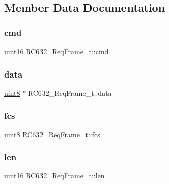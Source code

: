 \subsection{Member Data Documentation}
\mbox{\label{struct_r_c632___req_frame__t_a68d25a2924669c1db2505dfbd6fcb78c}} 
\subsubsection{\texorpdfstring{cmd}{cmd}}
{\footnotesize\ttfamily \mbox{\hyperlink{inc_2m1356dll_8h_a05f6b0ae8f6a6e135b0e290c25fe0e4e}{uint16}} R\+C632\+\_\+\+Req\+Frame\+\_\+t\+::cmd}

\mbox{\label{struct_r_c632___req_frame__t_aca00c37781da56bd4e68c812bf58f52c}} 
\subsubsection{\texorpdfstring{data}{data}}
{\footnotesize\ttfamily \mbox{\hyperlink{inc_2m1356dll_8h_adde6aaee8457bee49c2a92621fe22b79}{uint8}} $\ast$ R\+C632\+\_\+\+Req\+Frame\+\_\+t\+::data}

\mbox{\label{struct_r_c632___req_frame__t_a632b8737a5db3c9a947699c40345e165}} 
\subsubsection{\texorpdfstring{fcs}{fcs}}
{\footnotesize\ttfamily \mbox{\hyperlink{inc_2m1356dll_8h_adde6aaee8457bee49c2a92621fe22b79}{uint8}} R\+C632\+\_\+\+Req\+Frame\+\_\+t\+::fcs}

\mbox{\label{struct_r_c632___req_frame__t_a149ca47be10f9f2f248562e195e815de}} 
\subsubsection{\texorpdfstring{len}{len}}
{\footnotesize\ttfamily \mbox{\hyperlink{inc_2m1356dll_8h_a05f6b0ae8f6a6e135b0e290c25fe0e4e}{uint16}} R\+C632\+\_\+\+Req\+Frame\+\_\+t\+::len}

